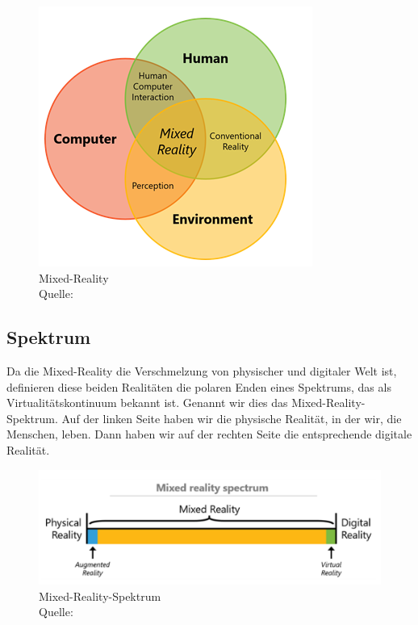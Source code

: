 \begin{figure}[ht]
	\centering
	\includegraphics[width=\textwidth,height=\textheight,keepaspectratio]{images/venndiagramm.png}
	\caption{Mixed-Reality \\ Quelle: \cite[vgl.][]{BrandonBray}}
	\label{Mixed-Reality4}
\end{figure}

\subsection{Spektrum}
Da die Mixed-Reality die Verschmelzung von physischer und digitaler Welt ist, definieren diese beiden Realitäten die polaren Enden eines Spektrums, das als Virtualitätskontinuum bekannt ist. Genannt wir dies das Mixed-Reality-Spektrum. Auf der linken Seite haben wir die physische Realität, in der wir, die Menschen, leben. Dann haben wir auf der rechten Seite die entsprechende digitale Realität.

\begin{figure}[ht]
	\centering
	\includegraphics[width=\textwidth,height=\textheight,keepaspectratio]{images/MixedRealitySpektrum.png}
	\caption{Mixed-Reality-Spektrum \\ Quelle: \cite[vgl.][]{BrandonBray}}
	\label{Mixed-Reality3}
\end{figure}

